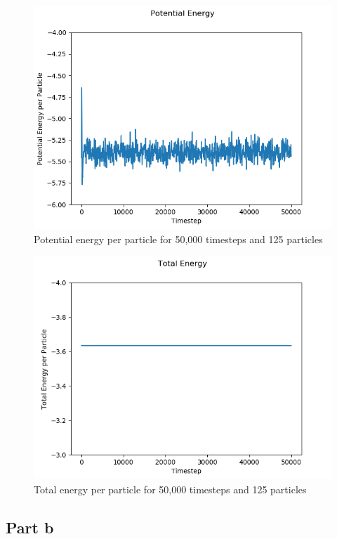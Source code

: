 \documentclass{article}
\begin{document}
	\begin{figure}[H]
				\centering
				\includegraphics[scale=0.5]{pot_energy}
				\caption{Potential energy per particle for 50,000 timesteps and 125 particles}
	\end{figure}

	\begin{figure}[H]
				\centering
				\includegraphics[scale=0.5]{tot_energy}
				\caption{Total energy per particle for 50,000 timesteps and 125 particles}
	\end{figure}
		

\subsection*{Part b}
\end{document}
